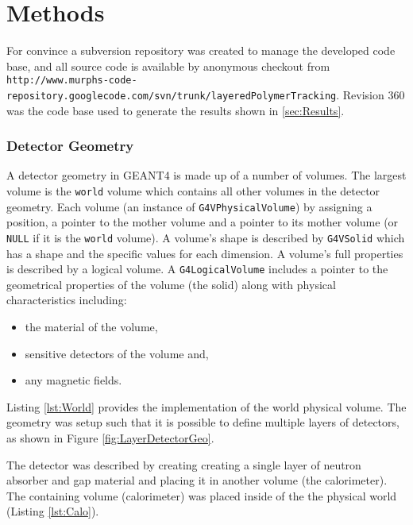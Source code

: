\section{Methods}
\label{sec:Methods}

For convince a subversion repository was created to manage the developed code base, and all source code is available by anonymous checkout from \verb+http://www.murphs-code-repository.googlecode.com/svn/trunk/layeredPolymerTracking+. Revision 360 was the code base used to generate the results shown in \ref{sec:Results}.

\subsubsection{Detector Geometry}
A detector geometry in GEANT4 is made up of a number of volumes.
The largest volume is the \verb+world+ volume which contains all other volumes in the detector geometry.
Each volume (an instance of \verb+G4VPhysicalVolume+) by assigning a position, a pointer to the mother volume and a pointer to its mother volume (or \verb+NULL+ if it is the \verb+world+ volume).
A volume's shape is described by \verb+G4VSolid+ which has a shape and the specific values for each dimension.
A volume's full properties is described by a logical volume.
A \verb+G4LogicalVolume+ includes a pointer to the geometrical properties of the volume (the solid) along with physical characteristics including:
\begin{itemize}
    \item the material of the volume,
    \item sensitive detectors of the volume and,
    \item any magnetic fields.
\end{itemize}
Listing \ref{lst:World} provides the implementation of the world physical volume.
The geometry was setup such that it is possible to define multiple layers of detectors, as shown in Figure \ref{fig:LayerDetectorGeo}.

The detector was described by creating creating a single layer of neutron absorber and gap material and placing it in another volume (the calorimeter).
The containing volume (calorimeter) was placed inside of the the physical world (Listing \ref{lst:Calo}).

